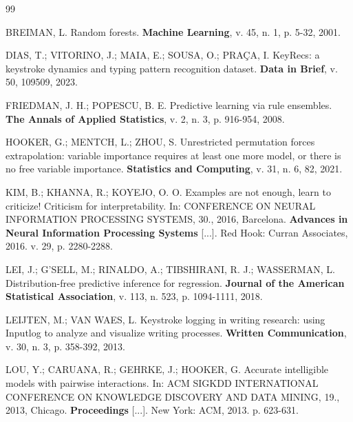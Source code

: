 \documentclass[12pt,a4paper]{article}
\begin{document}
\clearpage
\begin{thebibliography}{99}

BREIMAN, L. Random forests. \textbf{Machine Learning}, v. 45, n. 1, p. 5-32,
2001.

DIAS, T.; VITORINO, J.; MAIA, E.; SOUSA, O.; PRAÇA, I. KeyRecs: a keystroke
dynamics and typing pattern recognition dataset. \textbf{Data in Brief}, v. 50,
109509, 2023.

FRIEDMAN, J. H.; POPESCU, B. E. Predictive learning via rule ensembles.
\textbf{The Annals of Applied Statistics}, v. 2, n. 3, p. 916-954, 2008.

HOOKER, G.; MENTCH, L.; ZHOU, S. Unrestricted permutation forces extrapolation:
variable importance requires at least one more model, or there is no free
variable importance. \textbf{Statistics and Computing}, v. 31, n. 6, 82, 2021.

KIM, B.; KHANNA, R.; KOYEJO, O. O. Examples are not enough, learn to criticize!
Criticism for interpretability. In: CONFERENCE ON NEURAL INFORMATION PROCESSING
SYSTEMS, 30., 2016, Barcelona. \textbf{Advances in Neural Information
Processing Systems} [...]. Red Hook: Curran Associates, 2016. v. 29,
p. 2280-2288.

LEI, J.; G'SELL, M.; RINALDO, A.; TIBSHIRANI, R. J.; WASSERMAN, L.
Distribution-free predictive inference for regression. \textbf{Journal of the
American Statistical Association}, v. 113, n. 523, p. 1094-1111, 2018.

LEIJTEN, M.; VAN WAES, L. Keystroke logging in writing research: using Inputlog
to analyze and visualize writing processes. \textbf{Written Communication},
v. 30, n. 3, p. 358-392, 2013.

LOU, Y.; CARUANA, R.; GEHRKE, J.; HOOKER, G. Accurate intelligible models with
pairwise interactions. In: ACM SIGKDD INTERNATIONAL CONFERENCE ON KNOWLEDGE
DISCOVERY AND DATA MINING, 19., 2013, Chicago. \textbf{Proceedings} [...]. New
York: ACM, 2013. p. 623-631.


\end{thebibliography}
\end{document}
